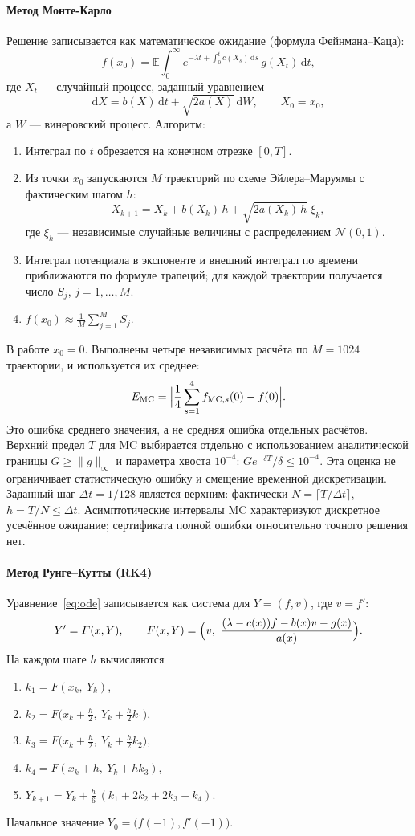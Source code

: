 \documentclass[14pt,a4paper]{extarticle}
\newcommand{\dd}{\mathrm{d}}
\begin{document}
\paragraph{Метод Монте-Карло\\}
Решение записывается как математическое ожидание (формула
Фейнмана--Каца):
\[
f(x_0)=\mathbb E\int_0^\infty
e^{-\lambda t+\int_0^t c(X_s)\,\dd s}\,g(X_t)\,\dd t,
\]
где $X_t$ --- случайный процесс, заданный уравнением
\[
\dd X=b(X)\,\dd t+\sqrt{2a(X)}\,\dd W,\qquad X_0=x_0,
\]
а $W$ --- винеровский процесс.
Алгоритм:
\begin{enumerate}
\item Интеграл по $t$ обрезается на конечном отрезке $[0,T]$.
\item Из точки $x_0$ запускаются $M$ траекторий по схеме
Эйлера--Маруямы с фактическим шагом $h$:
\[
X_{k+1}=X_k+b(X_k)\,h+\sqrt{2a(X_k)\,h}\;\xi_k,
\]
где $\xi_k$ --- независимые случайные величины с распределением
$\mathcal N(0,1)$.
\item Интеграл потенциала в экспоненте и внешний интеграл по времени
приближаются по формуле трапеций; для каждой траектории получается
число $S_j$, $j=1,\dots,M$.
\item $f(x_0)\approx\frac1M\sum_{j=1}^MS_j$.
\end{enumerate}
В работе $x_0=0$. Выполнены четыре независимых расчёта
по $M=1024$ траектории, и используется их среднее:
\[
E_{\mathrm{MC}}=\Bigl|\frac14\sum_{s=1}^4 f_{\mathrm{MC},s}(0)-f(0)\Bigr|.
\]
Это ошибка среднего значения, а не средняя ошибка отдельных расчётов.
Верхний предел $T$ для MC выбирается отдельно с использованием
аналитической границы $G\ge\|g\|_\infty$ и параметра хвоста $10^{-4}$:
$G e^{-\delta T}/\delta\le10^{-4}$. Эта оценка не ограничивает
статистическую ошибку и смещение временной дискретизации.
Заданный шаг $\Delta t=1/128$ является верхним: фактически
$N=\lceil T/\Delta t\rceil$, $h=T/N\le\Delta t$.
Асимптотические интервалы MC характеризуют дискретное усечённое ожидание;
сертификата полной ошибки относительно точного решения нет.

\paragraph{Метод Рунге--Кутты (RK4)\\}
Уравнение~\eqref{eq:ode} записывается как система для $Y=(f,v)$, где
$v=f'$:
\[
Y'=F(x,Y),\qquad
F(x,Y)=\Bigl(v,\ \frac{(\lambda-c(x))f-b(x)v-g(x)}{a(x)}\Bigr).
\]
На каждом шаге $h$ вычисляются
\begin{enumerate}
\item $k_1=F(x_k,\ Y_k)$,
\item $k_2=F\bigl(x_k+\tfrac h2,\ Y_k+\tfrac h2k_1\bigr)$,
\item $k_3=F\bigl(x_k+\tfrac h2,\ Y_k+\tfrac h2k_2\bigr)$,
\item $k_4=F(x_k+h,\ Y_k+hk_3)$,
\item $Y_{k+1}=Y_k+\tfrac h6\,(k_1+2k_2+2k_3+k_4)$.
\end{enumerate}
Начальное значение $Y_0=\bigl(f(-1),f'(-1)\bigr)$.
\end{document}
